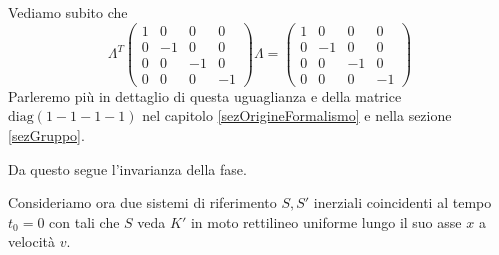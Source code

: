 \documentclass[12pt,a4paper,titlepage, twoside, openright]{book}
\newenvironment{proof:}[1][\proofname]{  %
 \begin{tcolorbox}[
	breakable, 
	enhanced, 
	interior hidden, 
	frame hidden, 
	borderline west = {1pt}{0pt}{gray}, 
	top=0pt, bottom=0pt, left=0pt]
\begin{proof}[#1:]~
}
{
\end{proof}
\end{tcolorbox}
}
\numberwithin{equation}{chapter}
\begin{document}
\begin{proof:}
Vediamo subito che \[\Lambda^T \left(\begin{array}{cccc}
1 & 0 & 0 & 0 \\
0 & -1 & 0 & 0 \\
0 & 0 & -1 & 0 \\
0 & 0 & 0 & -1
\end{array}\right) \Lambda = \left(\begin{array}{cccc}
1 & 0 & 0 & 0 \\
0 & -1 & 0 & 0 \\
0 & 0 & -1 & 0 \\
0 & 0 & 0 & -1
\end{array}\right) \]
Parleremo più in dettaglio di questa uguaglianza e della matrice $\text{diag}(1 -1 -1 -1)$ nel capitolo \ref{sezOrigineFormalismo} e nella sezione \ref{sezGruppo}.

Da questo segue l'invarianza della fase.
\end{proof:}

Consideriamo ora due sistemi di riferimento $S,S'$ inerziali coincidenti al tempo $t_0=0$ con tali che $S$ veda $K'$ in moto rettilineo uniforme lungo il suo asse $x$ a velocità $v$.
\end{document}
